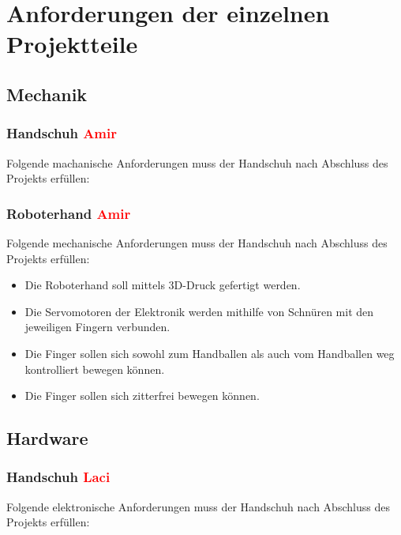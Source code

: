 \documentclass[11pt]{article}
\begin{document}
\hfill \break
\hfill \break
\hfill \break
\hfill \break
\hfill \break
\hfill \break
\hfill \break
\hfill \break


\section{Anforderungen der einzelnen Projektteile}

\subsection{Mechanik}
\subsubsection{Handschuh \textcolor{red}{Amir}}
Folgende machanische Anforderungen muss der Handschuh nach Abschluss des Projekts erfüllen:

\subsubsection{Roboterhand \textcolor{red}{Amir}}
Folgende mechanische Anforderungen muss der Handschuh nach Abschluss des Projekts erfüllen:

	\begin{itemize}
		\item Die Roboterhand soll mittels 3D-Druck gefertigt werden.
		\item Die Servomotoren der Elektronik werden mithilfe von Schnüren mit den jeweiligen Fingern verbunden.
		\item Die Finger sollen sich sowohl zum Handballen als auch vom Handballen weg kontrolliert bewegen können.
		\item Die Finger sollen sich zitterfrei bewegen können.
	\end{itemize}

\subsection{Hardware}
\subsubsection{Handschuh \textcolor{red}{Laci}}
Folgende elektronische Anforderungen muss der Handschuh nach Abschluss des Projekts erfüllen:
\end{document}
